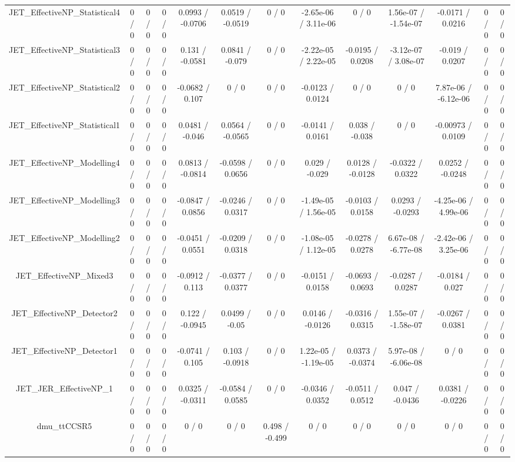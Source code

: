 \documentclass[10pt]{article}
\begin{document}
\begin{table}[htbp]
\begin{center}
\begin{tabular}{|c|c|c|c|c|c|c|c|c|c|c|c|c|}
  JET_EffectiveNP_Statistical4 & 0 / 0 & 0 / 0 & 0 / 0 & 0.0993 / -0.0706 & 0.0519 / -0.0519 & 0 / 0 & -2.65e-06 / 3.11e-06 & 0 / 0 & 1.56e-07 / -1.54e-07 & -0.0171 / 0.0216 & 0 / 0 & 0 / 0 \\ 
  JET_EffectiveNP_Statistical3 & 0 / 0 & 0 / 0 & 0 / 0 & 0.131 / -0.0581 & 0.0841 / -0.079 & 0 / 0 & -2.22e-05 / 2.22e-05 & -0.0195 / 0.0208 & -3.12e-07 / 3.08e-07 & -0.019 / 0.0207 & 0 / 0 & 0 / 0 \\ 
  JET_EffectiveNP_Statistical2 & 0 / 0 & 0 / 0 & 0 / 0 & -0.0682 / 0.107 & 0 / 0 & 0 / 0 & -0.0123 / 0.0124 & 0 / 0 & 0 / 0 & 7.87e-06 / -6.12e-06 & 0 / 0 & 0 / 0 \\ 
  JET_EffectiveNP_Statistical1 & 0 / 0 & 0 / 0 & 0 / 0 & 0.0481 / -0.046 & 0.0564 / -0.0565 & 0 / 0 & -0.0141 / 0.0161 & 0.038 / -0.038 & 0 / 0 & -0.00973 / 0.0109 & 0 / 0 & 0 / 0 \\ 
  JET_EffectiveNP_Modelling4 & 0 / 0 & 0 / 0 & 0 / 0 & 0.0813 / -0.0814 & -0.0598 / 0.0656 & 0 / 0 & 0.029 / -0.029 & 0.0128 / -0.0128 & -0.0322 / 0.0322 & 0.0252 / -0.0248 & 0 / 0 & 0 / 0 \\ 
  JET_EffectiveNP_Modelling3 & 0 / 0 & 0 / 0 & 0 / 0 & -0.0847 / 0.0856 & -0.0246 / 0.0317 & 0 / 0 & -1.49e-05 / 1.56e-05 & -0.0103 / 0.0158 & 0.0293 / -0.0293 & -4.25e-06 / 4.99e-06 & 0 / 0 & 0 / 0 \\ 
  JET_EffectiveNP_Modelling2 & 0 / 0 & 0 / 0 & 0 / 0 & -0.0451 / 0.0551 & -0.0209 / 0.0318 & 0 / 0 & -1.08e-05 / 1.12e-05 & -0.0278 / 0.0278 & 6.67e-08 / -6.77e-08 & -2.42e-06 / 3.25e-06 & 0 / 0 & 0 / 0 \\ 
  JET_EffectiveNP_Mixed3 & 0 / 0 & 0 / 0 & 0 / 0 & -0.0912 / 0.113 & -0.0377 / 0.0377 & 0 / 0 & -0.0151 / 0.0158 & -0.0693 / 0.0693 & -0.0287 / 0.0287 & -0.0184 / 0.027 & 0 / 0 & 0 / 0 \\ 
  JET_EffectiveNP_Detector2 & 0 / 0 & 0 / 0 & 0 / 0 & 0.122 / -0.0945 & 0.0499 / -0.05 & 0 / 0 & 0.0146 / -0.0126 & -0.0316 / 0.0315 & 1.55e-07 / -1.58e-07 & -0.0267 / 0.0381 & 0 / 0 & 0 / 0 \\ 
  JET_EffectiveNP_Detector1 & 0 / 0 & 0 / 0 & 0 / 0 & -0.0741 / 0.105 & 0.103 / -0.0918 & 0 / 0 & 1.22e-05 / -1.19e-05 & 0.0373 / -0.0374 & 5.97e-08 / -6.06e-08 & 0 / 0 & 0 / 0 & 0 / 0 \\ 
  JET_JER_EffectiveNP_1 & 0 / 0 & 0 / 0 & 0 / 0 & 0.0325 / -0.0311 & -0.0584 / 0.0585 & 0 / 0 & -0.0346 / 0.0352 & -0.0511 / 0.0512 & 0.047 / -0.0436 & 0.0381 / -0.0226 & 0 / 0 & 0 / 0 \\ 
  dmu_ttCCSR5 & 0 / 0 & 0 / 0 & 0 / 0 & 0 / 0 & 0 / 0 & 0.498 / -0.499 & 0 / 0 & 0 / 0 & 0 / 0 & 0 / 0 & 0 / 0 & 0 / 0 \\ 

\end{tabular}
\end{center}
\end{table}
\end{document}
